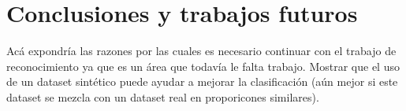 \newpage
\section{Conclusiones y trabajos futuros}

	Acá expondría las razones por las cuales es necesario continuar con el trabajo de reconocimiento ya que es un área que todavía le falta trabajo. Mostrar que el uso de un dataset sintético puede ayudar a mejorar la clasificación (aún mejor si este dataset se mezcla con un dataset real en proporicones similares).